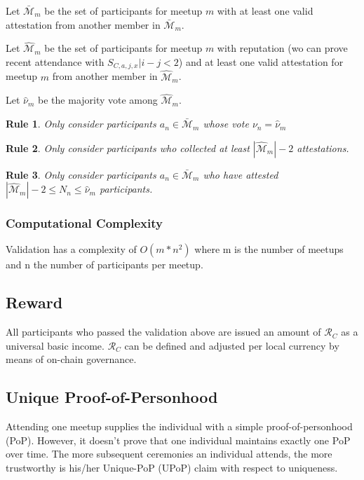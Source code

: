 \documentclass[conference]{IEEEtran}
\newtheorem{erule}{Rule}
\begin{document}
Let $\mathcal{\bar M}_m$ be the set of participants for meetup $m$ with at least one valid attestation from another member in $\mathcal{\bar M}_m$.

Let $\mathcal{\hat M}_m$ be the set of participants for meetup $m$ with reputation (wo can prove recent attendance with $S_{C,a,j,x} |i-j<2$) and at least one valid attestation for meetup $m$ from another member in $\mathcal{\hat M}_m$.

Let $\hat\nu_m$ be the majority vote among $\mathcal{\hat M}_m$.

\begin{erule}\label{rule:votingcorrectly}
	Only consider participants $a_n \in \mathcal{\bar M}_m$ whose vote $\nu_n = \hat\nu_m$
\end{erule}

\begin{erule}
	Only consider participants who collected at least $|\mathcal{\hat M}_m|-2$ attestations.
\end{erule}
\begin{erule}\label{rule:hasattested}
	Only consider participants $a_n \in \mathcal{\bar M}_m$ who have attested $|\mathcal{\hat M}_m|-2 \leq N_n \leq \hat\nu_m$ participants.
\end{erule}

\subsubsection{Computational Complexity}
Validation has a complexity of $O(m*n^2)$ where m is the number of meetups and n the number of participants per meetup. 

\subsection{Reward}
All participants who passed the validation above are issued an amount of $\mathcal{R}_C$ as a universal basic income. $\mathcal{R}_C$ can be defined and adjusted per local currency by means of on-chain governance.  

\subsection{Unique Proof-of-Personhood}
Attending one meetup supplies the individual with a simple proof-of-personhood (PoP). However, it doesn't prove that one individual maintains exactly one PoP over time. The more subsequent ceremonies an individual attends, the more trustworthy is his/her Unique-PoP (UPoP) claim with respect to uniqueness.
\end{document}
